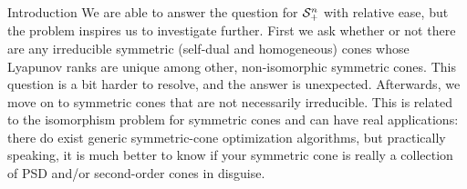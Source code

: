 \documentclass{interact}
\theoremstyle{plain}
\theoremstyle{definition}
\theoremstyle{remark}
\begin{document}
\begin{section}{Introduction}
    We are able to answer the question for $\mathcal{S}^{n}_{+}$ with relative
    ease, but the problem inspires us to investigate further. First
    we ask whether or not there are any irreducible symmetric
    (self-dual and homogeneous) cones whose Lyapunov ranks are unique
    among other, non-isomorphic symmetric cones. This question is a
    bit harder to resolve, and the answer is unexpected. Afterwards,
    we move on to symmetric cones that are not necessarily
    irreducible. This is related to the isomorphism problem for
    symmetric cones and can have real applications: there do exist
    generic symmetric-cone optimization algorithms, but practically
    speaking, it is much better to know if your symmetric cone is
    really a collection of PSD and/or second-order cones in disguise.
  \end{section}
\end{document}
